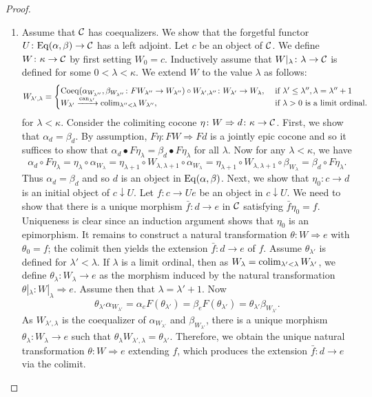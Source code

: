 \begin{proof}
\begin{enumerate}
    \item Assume that $\mathcal{C}$ has coequalizers. We show that the forgetful functor $U\colon \mathrm{Eq}(\alpha,\beta)\to \mathcal{C}$ has a left adjoint. Let $c$ be an object of $\mathcal{C}$. We define $W\colon \kappa\to \mathcal{C}$ by first setting $W_0 = c$. Inductively assume that $W|_{\lambda}\colon \lambda\to \mathcal{C}$ is defined for some $0<\lambda<\kappa$. We extend $W$ to the value $\lambda$ as follows:
    {\small $$
    W_{\lambda',\lambda} = \begin{cases}
        \mathrm{Coeq}(\alpha_{W_{\lambda''}},\beta_{W_{\lambda''}}\colon FW_{\lambda''}\to W_{\lambda''})\circ W_{\lambda',\lambda''}\colon W_{\lambda'}\to W_{\lambda}, &\text{ if $\lambda'\leq\lambda'', \lambda = \lambda''+1$}\\
        W_{\lambda'}\xrightarrow{\text{can}_{\lambda'}}\operatorname*{colim}_{{\lambda''}<\lambda}W_{\lambda''}, & \text{ if $\lambda>0$ is a limit ordinal.}
    \end{cases}
    $$
    }
    for $\lambda< \kappa$. Consider the colimiting cocone $\eta\colon W\Rightarrow d\colon \kappa\to \mathcal{C}$. First, we show that $\alpha_d = \beta_d$. By assumption, $F\eta\colon FW\Rightarrow Fd$ is a jointly epic cocone and so it suffices to show that $\alpha_d\bullet F\eta_\lambda = \beta_d\bullet F\eta_\lambda$ for all $\lambda$. Now for any $\lambda< \kappa$, we have
    $$
    \alpha_d\circ F\eta_\lambda = \eta_\lambda \circ\alpha_{W_\lambda} = \eta_{\lambda+1}\circ W_{\lambda,\lambda+1}\circ \alpha_{W_\lambda} = \eta_{\lambda+1}\circ W_{\lambda,\lambda+1}\circ \beta_{W_\lambda} = \beta_d\circ F\eta_\lambda.
    $$
    Thus $\alpha_d = \beta_d$ and so $d$ is an object in $\mathrm{Eq}(\alpha,\beta)$. Next, we show that $\eta_0\colon c\to d$ is an initial object of $c\downarrow U$. Let $f\colon c\to Ue$ be an object in $c\downarrow U$. We need to show that there is a unique morphism $\bar{f}\colon d\to e$ in $\mathcal{C}$ satisfying $\bar{f}\eta_0 = f$. Uniqueness is clear since an induction argument shows that $\eta_0$ is an epimorphism. It remains to construct a natural transformation $\theta\colon W\Rightarrow e$ with $\theta_0 = f$; the colimit then yields the extension $\bar{f}\colon d\to e$ of $f$. Assume $\theta_{\lambda'}$ is defined for $\lambda'< \lambda$. If $\lambda$ is a limit ordinal, then as $W_\lambda = \operatorname*{colim}_{\lambda'< \lambda} W_{\lambda'}$, we define $\theta_\lambda\colon W_\lambda\to e$ as the morphism induced by the natural transformation $\theta|_\lambda\colon W|_\lambda\Rightarrow e$. Assume then that $\lambda = \lambda'+1$. Now
    \[
    \theta_{\lambda'} \alpha_{W_{\lambda'}} = \alpha_e F(\theta_{\lambda'}) = \beta_e F(\theta_{\lambda'}) = \theta_{\lambda'}\beta_{W_{\lambda'}}.
    \]
    As $W_{\lambda',\lambda}$ is the coequalizer of $\alpha_{W_{\lambda'}}$ and $\beta_{W_{\lambda'}}$, there is a unique morphism $\theta_{\lambda}\colon W_\lambda\to e$ such that $\theta_\lambda W_{\lambda',\lambda} = \theta_{\lambda'}$. Therefore, we obtain the unique natural transformation $\theta\colon W\Rightarrow e$ extending $f$, which produces the extension $\bar{f}\colon d\to e$ via the colimit.\qedhere
\end{enumerate}
\end{proof}

